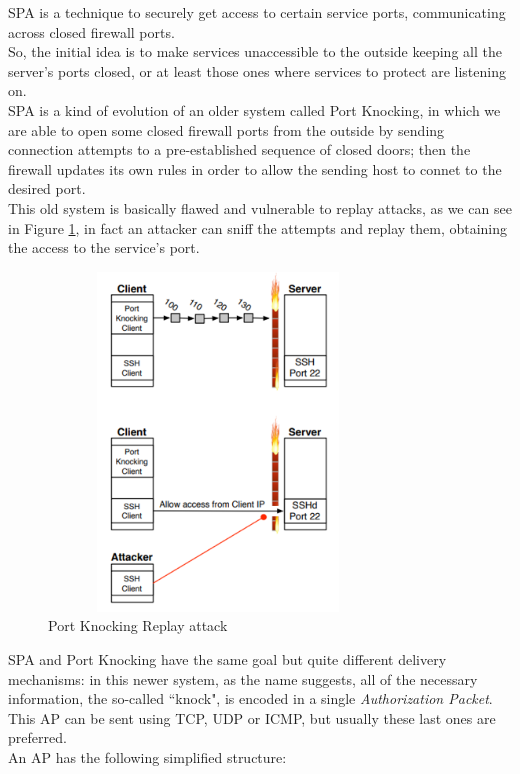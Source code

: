 \documentclass[12pt]{report}
\begin{document}
{{SPA is a technique to securely get access to certain service ports, communicating across closed firewall ports.\\
So, the initial idea is to make services unaccessible to the outside keeping all the server's ports closed, or at least those ones where services to protect are listening on.\\

SPA is a kind of evolution of an older system called Port Knocking, in which we are able to  open some closed firewall ports from the outside by sending connection attempts to a pre-established sequence of closed doors; then the firewall updates its own rules in order to allow the sending host to connet to the desired port.\\
This old system is basically flawed and vulnerable to replay attacks, as we can see in Figure \ref{fig:portknocking}, in fact an attacker can sniff the attempts and replay them, obtaining the access to the service's port.\\

\begin{figure}[H]
\includegraphics[width=9cm,height=9cm,keepaspectratio]{port_knocking}
\centering
\caption{Port Knocking Replay attack}
\label{fig:portknocking}
\end{figure}

SPA and Port Knocking have the same goal but quite different delivery mechanisms: in this newer system, as the name suggests, all of the necessary information, the so-called ``knock", is encoded in a single \emph{Authorization Packet}.\\
This AP can be sent using TCP, UDP or ICMP, but usually these last ones are preferred.\\
An AP has the following simplified structure:

}}
\end{document}
